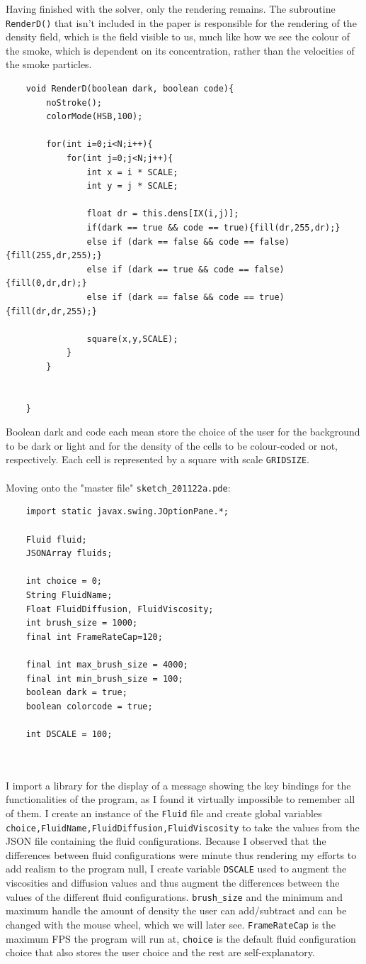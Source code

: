 \documentclass[12pt,a4paper]{book}
\begin{document}
Having finished with the solver, only the rendering remains. The subroutine \verb|RenderD()| that isn't included in the paper is responsible for the rendering of the density field, which is the field visible to us, much like how we see the colour of the smoke, which is dependent on its concentration, rather than the velocities of the smoke particles.
\begin{lstlisting}
	void RenderD(boolean dark, boolean code){
		noStroke();
		colorMode(HSB,100);
		
		for(int i=0;i<N;i++){
			for(int j=0;j<N;j++){
				int x = i * SCALE;
				int y = j * SCALE;
				
				float dr = this.dens[IX(i,j)];
				if(dark == true && code == true){fill(dr,255,dr);}
				else if (dark == false && code == false){fill(255,dr,255);}
				else if (dark == true && code == false){fill(0,dr,dr);}
				else if (dark == false && code == true){fill(dr,dr,255);}
				
				square(x,y,SCALE);
			}
		}
		
		
	}
\end{lstlisting}
Boolean dark and code each mean store the choice of the user for the background to be dark or light and for the density of the cells to be colour-coded or not, respectively. Each cell is represented by a square with scale \verb|GRIDSIZE|. \\
\\
Moving onto the "master file" \verb|sketch_201122a.pde|:
\begin{lstlisting}
	import static javax.swing.JOptionPane.*;
	
	Fluid fluid;
	JSONArray fluids;
	
	int choice = 0;
	String FluidName;
	Float FluidDiffusion, FluidViscosity;
	int brush_size = 1000;
	final int FrameRateCap=120;
	
	final int max_brush_size = 4000;
	final int min_brush_size = 100;
	boolean dark = true;
	boolean colorcode = true;
	
	int DSCALE = 100;
	
	
\end{lstlisting}
I import a library for the display of a message showing the key bindings for the functionalities of the program, as I found it virtually impossible to remember all of them. I create an instance of the \verb|Fluid| file and create global variables \verb|choice,FluidName,FluidDiffusion,FluidViscosity| to take the values from the JSON file containing the fluid configurations. Because I observed that the differences between fluid configurations were minute thus rendering my efforts to add realism to the program null, I create variable \verb|DSCALE| used to augment the viscosities and diffusion values and thus augment the differences between the values of the different fluid configurations. \verb|brush_size| and the minimum and maximum handle the amount of density the user can add/subtract and can be changed with the mouse wheel, which we will later see. \verb|FrameRateCap| is the maximum FPS the program will run at, \verb|choice| is the default fluid configuration choice that also stores the user choice and the rest are self-explanatory.\\
\end{document}
